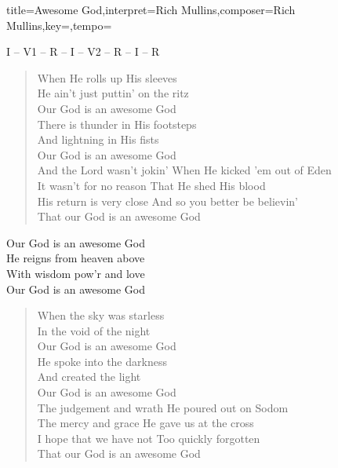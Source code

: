 \documentclass{leadsheet}
\begin{document}
\begin{song}{title={Awesome God},interpret={Rich Mullins},composer={Rich Mullins},key={},tempo={}}

\begin{schedule}
I -- V1 -- R -- I -- V2 -- R -- I -- R
\end{schedule}

\begin{intro}
\end{intro}

\begin{verse}
When He rolls up His sleeves \\
He ain't just puttin' on the ritz \\
Our God is an awesome God \\
There is thunder in His footsteps \\
And lightning in His fists \\
Our God is an awesome God \\
And the Lord wasn't jokin' When He kicked 'em out of Eden \\
It wasn't for no reason That He shed His blood \\
His return is very close And so you better be believin' \\
That our God is an awesome God
\end{verse}

\begin{chorus}
Our God is an awesome God \\
He reigns from heaven above \\
With wisdom pow'r and love \\
Our God is an awesome God
\end{chorus}

\begin{verse}
When the sky was starless \\
In the void of the night \\
Our God is an awesome God \\
He spoke into the darkness \\
And created the light \\
Our God is an awesome God \\
The judgement and wrath He poured out on Sodom \\
The mercy and grace He gave us at the cross \\
I hope that we have not Too quickly forgotten \\
That our God is an awesome God
\end{verse}

\end{song}
\end{document}

